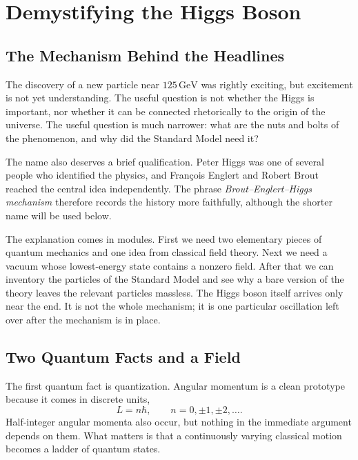 \chapter{Demystifying the Higgs Boson}


\section{The Mechanism Behind the Headlines}

The discovery of a new particle near $125\,\mathrm{GeV}$ was rightly exciting, but excitement is not yet understanding. The useful question is not whether the Higgs is important, nor whether it can be connected rhetorically to the origin of the universe. The useful question is much narrower: what are the nuts and bolts of the phenomenon, and why did the Standard Model need it?

The name also deserves a brief qualification. Peter Higgs was one of several people who identified the physics, and Fran\c{c}ois Englert and Robert Brout reached the central idea independently. The phrase \emph{Brout--Englert--Higgs mechanism} therefore records the history more faithfully, although the shorter name will be used below.

The explanation comes in modules. First we need two elementary pieces of quantum mechanics and one idea from classical field theory. Next we need a vacuum whose lowest-energy state contains a nonzero field. After that we can inventory the particles of the Standard Model and see why a bare version of the theory leaves the relevant particles massless. The Higgs boson itself arrives only near the end. It is not the whole mechanism; it is one particular oscillation left over after the mechanism is in place.

\section{Two Quantum Facts and a Field}

The first quantum fact is quantization. Angular momentum is a clean prototype because it comes in discrete units,
\begin{equation}
L=n\hbar,
\qquad
n=0,\pm1,\pm2,\ldots .
\end{equation}
Half-integer angular momenta also occur, but nothing in the immediate argument depends on them. What matters is that a continuously varying classical motion becomes a ladder of quantum states.

